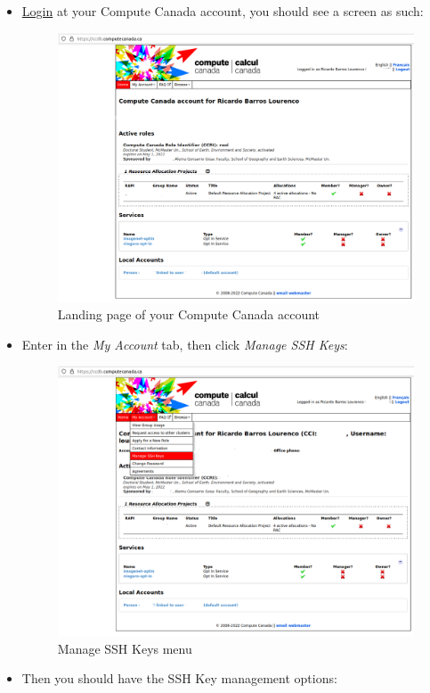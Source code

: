 \documentclass[
]{book}
\begin{document}
\begin{itemize}
\item
  \href{https://ccdb.computecanada.ca/}{Login} at your Compute Canada account, you should see a screen as such:

  \begin{figure}
  \includegraphics[width=1\linewidth]{images/cc_accnt_01} \caption{Landing page of your Compute Canada account}\label{fig:figure1}
  \end{figure}
\item
  Enter in the \emph{My Account} tab, then click \emph{Manage SSH Keys}:

  \begin{figure}
  \includegraphics[width=1\linewidth]{images/cc_accnt_02} \caption{Manage SSH Keys menu}\label{fig:figure2}
  \end{figure}
\item
  Then you should have the SSH Key management options:


\end{itemize}
\end{document}
